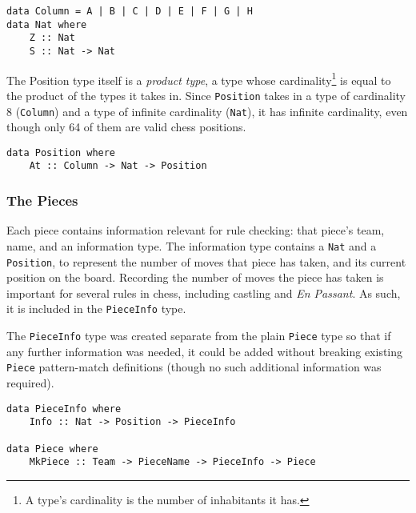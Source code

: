 \documentclass[12pt, a4paper, bibliography=totocnumbered]{scrartcl}
\begin{document}

\begin{lstlisting}
data Column = A | B | C | D | E | F | G | H
data Nat where
    Z :: Nat
    S :: Nat -> Nat
\end{lstlisting}

The Position type itself is a \emph{product type}, a type whose cardinality\footnote{A type's cardinality is the number of inhabitants it has.} is equal to the product of the types it takes in. Since \lstinline{Position} takes in a type of cardinality 8 (\lstinline{Column}) and a type of infinite cardinality (\lstinline{Nat}), it has infinite cardinality, even though only 64 of them are valid chess positions.


\begin{lstlisting}
data Position where
    At :: Column -> Nat -> Position
\end{lstlisting}

\subsubsection{The Pieces}

Each piece contains information relevant for rule checking: that piece's team, name, and an information type. The information type contains a \lstinline{Nat} and a \lstinline{Position}, to represent the number of moves that piece has taken, and its current position on the board. Recording the number of moves the piece has taken is important for several rules in chess, including castling and \textit{En Passant}. As such, it is included in the \lstinline{PieceInfo} type.

The \lstinline{PieceInfo} type was created separate from the plain \lstinline{Piece} type so that if any further information was needed, it could be added without breaking existing \lstinline{Piece} pattern-match definitions (though no such additional information was required).

\begin{lstlisting}
data PieceInfo where
    Info :: Nat -> Position -> PieceInfo

data Piece where
    MkPiece :: Team -> PieceName -> PieceInfo -> Piece
\end{lstlisting}
\end{document}
